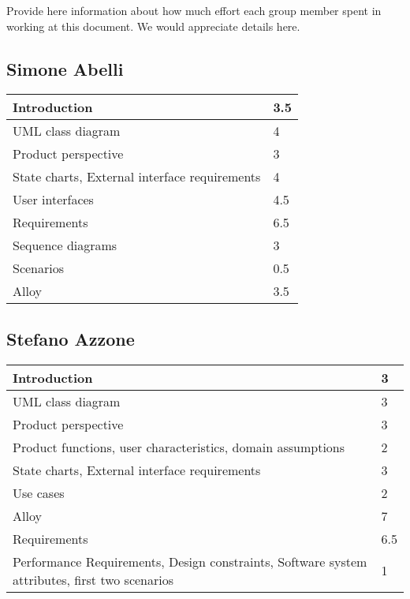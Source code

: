 Provide here information about how much effort each group member spent in working at this document. We would appreciate details here.\\

\subsection{Simone Abelli}
\begin{tabular} { | m{5cm} | m{1cm} | }
	\hline
	Introduction & 3.5\\
	\hline
	UML class diagram & 4\\
	\hline
	Product perspective & 3\\
	\hline
	State charts, External interface requirements & 4\\
	\hline
	User interfaces & 4.5\\
	\hline
	Requirements & 6.5\\
	\hline
	Sequence diagrams & 3\\
	\hline
	Scenarios & 0.5\\
	\hline
	Alloy & 3.5\\
	\hline
\end{tabular}

\subsection{Stefano Azzone}
\begin{tabular} { | m{5cm} | m{1cm} | }
	\hline
	Introduction & 3\\
	\hline
	UML class diagram & 3\\
	\hline
	Product perspective & 3\\
	\hline
	Product functions, user characteristics, domain assumptions & 2\\
	\hline
	State charts, External interface requirements & 3\\
	\hline
	Use cases & 2\\
	\hline
	Alloy & 7\\
	\hline
	Requirements & 6.5\\
	\hline
	Performance Requirements, Design constraints, Software system attributes, first two scenarios & 1\\
	\hline
\end{tabular}